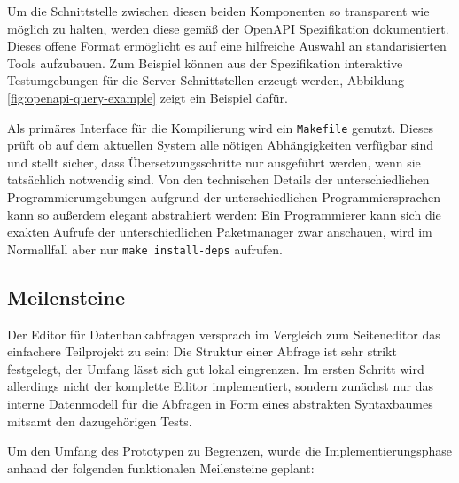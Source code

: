 Um die Schnittstelle zwischen diesen beiden Komponenten so transparent wie möglich zu halten, werden diese gemäß der OpenAPI Spezifikation \cite{open-api} dokumentiert. Dieses offene Format ermöglicht es auf eine hilfreiche Auswahl an standarisierten Tools aufzubauen. Zum Beispiel können aus der Spezifikation interaktive Testumgebungen für die Server-Schnittstellen erzeugt werden, Abbildung \ref{fig:openapi-query-example} zeigt ein Beispiel dafür.

Als primäres Interface für die Kompilierung wird ein \lstinline{Makefile} genutzt. Dieses prüft ob auf dem aktuellen System alle nötigen Abhängigkeiten verfügbar sind und stellt sicher, dass Übersetzungsschritte nur ausgeführt werden, wenn sie tatsächlich notwendig sind. Von den technischen Details der unterschiedlichen Programmierumgebungen aufgrund der unterschiedlichen Programmiersprachen kann so außerdem elegant abstrahiert werden: Ein Programmierer kann sich die exakten Aufrufe der unterschiedlichen Paketmanager zwar anschauen, wird im Normallfall aber nur \lstinline{make install-deps} aufrufen.

\subsection{Meilensteine}

Der Editor für Datenbankabfragen versprach im Vergleich zum Seiteneditor das einfachere Teilprojekt zu sein: Die Struktur einer Abfrage ist sehr strikt festgelegt, der Umfang lässt sich gut lokal eingrenzen. Im ersten Schritt wird allerdings nicht der komplette Editor implementiert, sondern zunächst nur das interne Datenmodell für die Abfragen in Form eines abstrakten Syntaxbaumes mitsamt den dazugehörigen Tests.

Um den Umfang des Prototypen zu Begrenzen, wurde die Implementierungsphase anhand der folgenden funktionalen Meilensteine geplant:

